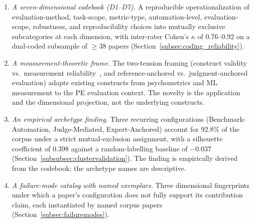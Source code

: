 \documentclass[acmsmall, nonacm, screen]{acmart}
\begin{document}
\begin{enumerate}
\item \textit{A seven-dimensional codebook (D1--D7).} A reproducible
operationalization of evaluation-method, task-scope, metric-type,
automation-level, evaluation-scope, robustness, and reproducibility
choices into mutually exclusive subcategories at each dimension, with
inter-rater Cohen's $\kappa$ of 0.76--0.92 on a dual-coded subsample
of $\geq38$ papers (Section~\ref{subsec:coding_reliability}).

\item \textit{A measurement-theoretic frame.} The two-tension framing
(construct validity vs.\ measurement
reliability~\cite{cronbach1955construct, messick1995validity,
jacobs2021measurement}, and reference-anchored vs.\ judgment-anchored
evaluation) adapts existing constructs from psychometrics and ML
measurement to the PE evaluation context. The novelty is the
application and the dimensional projection, not the underlying
constructs.

\item \textit{An empirical archetype finding.} Three recurring
configurations (Benchmark-Automation, Judge-Mediated,
Expert-Anchored) account for 92.8\% of the corpus under a strict
mutual-exclusion assignment, with a silhouette coefficient of 0.398
against a random-labelling baseline of $-0.037$
(Section~\ref{subsubsec:clustervalidation}). The finding is
empirically derived from the codebook; the archetype names are
descriptive.

\item \textit{A failure-mode catalog with named exemplars.}
Three dimensional fingerprints under which a paper's configuration
does not fully support its contribution claim, each instantiated by
named corpus papers (Section~\ref{subsec:failuremodes}).
\end{enumerate}
\end{document}
